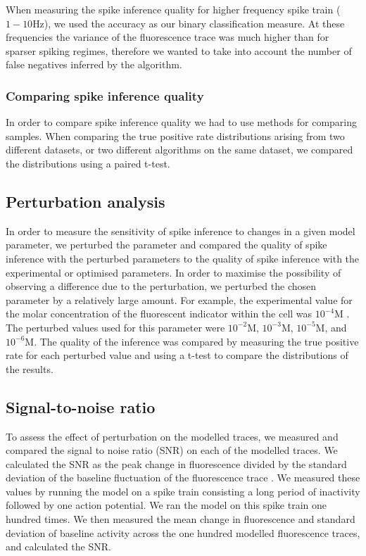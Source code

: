 When measuring the spike inference quality for higher frequency spike train ($1-10$Hz), we used the accuracy as our binary classification measure. At these frequencies the variance of the fluorescence trace was much higher than for sparser spiking regimes, therefore we wanted to take into account the number of false negatives inferred by the algorithm.

\subsubsection{Comparing spike inference quality}
In order to compare spike inference quality we had to use methods for comparing samples. When comparing the true positive rate distributions arising from two different datasets, or two different algorithms on the same dataset, we compared the distributions using a paired t-test. %

\subsection{Perturbation analysis}
In order to measure the sensitivity of spike inference to changes in a given model parameter, we perturbed the parameter and compared the quality of spike inference with the perturbed parameters to the quality of spike inference with the experimental or optimised parameters. In order to maximise the possibility of observing a difference due to the perturbation, we perturbed the chosen parameter by a relatively large amount. For example, the experimental value for the molar concentration of the fluorescent indicator within the cell was $10^{-4}$M  \parencite{maravall}. The perturbed values used for this parameter were $10^{-2}$M, $10^{-3}$M, $10^{-5}$M, and $10^{-6}$M. The quality of the inference was compared by measuring the true positive rate for each perturbed value and using a t-test to compare the distributions of the results.

\subsection{Signal-to-noise ratio}\label{sec:snr}
To assess the effect of perturbation on the modelled traces, we measured and compared the signal to noise ratio (SNR) on each of the modelled traces. We calculated the SNR as the peak change in fluorescence divided by the standard deviation of the baseline fluctuation of the fluorescence trace  \parencite{tada}. We measured these values by running the model on a spike train consisting a long period of inactivity followed by one action potential. We ran the model on this spike train one hundred times. We then measured the mean change in fluorescence and standard deviation of baseline activity across the one hundred modelled fluorescence traces, and calculated the SNR.

